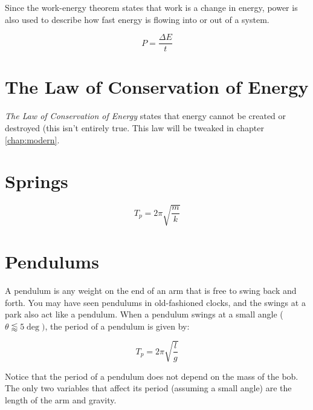 	Since the work-energy theorem states that work is a change in energy, power is also used to describe how fast energy is flowing into or out of a system.
	
	\begin{mdframed}[backgroundcolor=orange!20!white]
		\begin{equation}
			P = \frac{\Delta E}{t}
			\label{equation:poweralt}
		\end{equation}
	\end{mdframed}
	

	
	
	\section{The Law of Conservation of Energy}
	\textit{The Law of Conservation of Energy} states that energy cannot be created or destroyed (this isn't entirely true.  This law will be tweaked in chapter \ref{chap:modern}.
	
	\section{Springs}
	
		\begin{mdframed}[backgroundcolor=orange!20!white]
		\begin{equation}
		T_p = 2 \pi \sqrt{\frac{m}{k}}
		\label{eqn:springperiod}
		\end{equation}
	\end{mdframed}
	
	\section{Pendulums}
	A pendulum is any weight on the end of an arm that is free to swing back and forth.  You may have seen pendulums in old-fashioned clocks, and the swings at a park also act like a pendulum.  When a pendulum swings at a small angle ($\theta \lessapprox 5 \deg)$, the period of a pendulum is given by:
	
	\begin{mdframed}[backgroundcolor=orange!20!white]
		\begin{equation}
			T_p = 2 \pi \sqrt{\frac{l}{g}}
			\label{eqn:pendulumperiod}
		\end{equation}
	\end{mdframed}
	
	Notice that the period of a pendulum does not depend on the mass of the bob.  The only two variables that affect its period (assuming a small angle) are the length of the arm and gravity.  
	
	
	 
	

		


	


